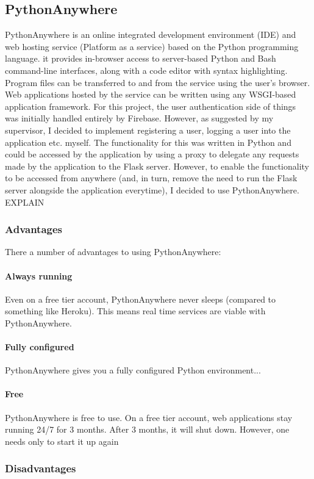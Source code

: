 \subsection{PythonAnywhere}
PythonAnywhere is an online integrated development environment (IDE) and web hosting service (Platform as a service) based on the Python programming language. it provides in-browser access to server-based Python and Bash command-line interfaces, along with a code editor with syntax highlighting. Program files can be transferred to and from the service using the user's browser. Web applications hosted by the service can be written using any WSGI-based application framework. For this project, the user authentication side of things was initially handled entirely by Firebase. However, as suggested by my supervisor, I decided to implement registering a user, logging a user into the application etc. myself. The functionality for this was written in Python and could be accessed by the application by using a proxy to delegate any requests made by the application to the Flask server. However, to enable the functionality to be accessed from anywhere (and, in turn, remove the need to run the Flask server alongside the application everytime), I decided to use PythonAnywhere. EXPLAIN

\subsubsection{Advantages}
There a number of advantages to using PythonAnywhere:

\paragraph{Always running}
Even on a free tier account, PythonAnywhere never sleeps (compared to something like Heroku). This means real time services are viable with PythonAnywhere.

\paragraph{Fully configured}
PythonAnywhere gives you a fully configured Python environment...

\paragraph{Free}
PythonAnywhere is free to use. On a free tier account, web applications stay running 24/7 for 3 months. After 3 months, it will shut down. However, one needs only to start it up again

\subsubsection{Disadvantages}
